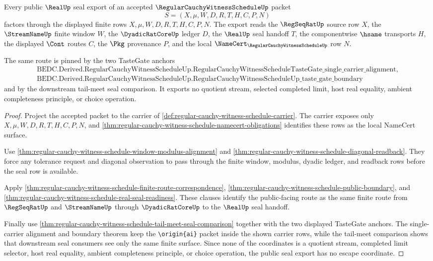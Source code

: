 \begin{theorem}
\label{thm:regular-cauchy-witness-schedule-seal-public-export}
Every public $\RealUp$ seal export of an accepted $\RegularCauchyWitnessScheduleUp$ packet
$$
S=(X,\mu,W,D,R,T,H,C,P,N)
$$
factors through the displayed finite rows $X,\mu,W,D,R,T,H,C,P,N$. The export reads the $\RegSeqRatUp$ source row $X$, the $\StreamNameUp$ finite window $W$, the $\DyadicRatCoreUp$ ledger $D$, the $\RealUp$ seal handoff $T$, the componentwise $\hsame$ transports $H$, the displayed $\Cont$ routes $C$, the $\Pkg$ provenance $P$, and the local $\NameCert_{\RegularCauchyWitnessScheduleUp}$ row $N$.

The same route is pinned by the two TasteGate anchors
$$
\begin{gathered}
\text{BEDC.Derived.RegularCauchyWitnessScheduleUp.RegularCauchyWitnessScheduleTasteGate\_single\_carrier\_alignment},\\
\text{BEDC.Derived.RegularCauchyWitnessScheduleUp.RegularCauchyWitnessScheduleUp\_taste\_gate\_boundary}
\end{gathered}
$$
and by the downstream tail-meet seal comparison. It exports no quotient stream, selected completed limit, host real equality, ambient completeness principle, or choice operation.
\end{theorem}
\begin{proof}
Project the accepted packet to the carrier of \autoref{def:regular-cauchy-witness-schedule-carrier}. The carrier exposes only $X,\mu,W,D,R,T,H,C,P,N$, and \autoref{thm:regular-cauchy-witness-schedule-namecert-obligations} identifies these rows as the local NameCert surface.

Use \autoref{thm:regular-cauchy-witness-schedule-window-modulus-alignment} and \autoref{thm:regular-cauchy-witness-schedule-diagonal-readback}. They force any tolerance request and diagonal observation to pass through the finite window, modulus, dyadic ledger, and readback rows before the seal row is available.

Apply \autoref{thm:regular-cauchy-witness-schedule-finite-route-correspondence}, \autoref{thm:regular-cauchy-witness-schedule-public-boundary}, and \autoref{thm:regular-cauchy-witness-schedule-real-seal-readiness}. These clauses identify the public-facing route as the same finite route from $\RegSeqRatUp$ and $\StreamNameUp$ through $\DyadicRatCoreUp$ to the $\RealUp$ seal handoff.

Finally use \autoref{thm:regular-cauchy-witness-schedule-tail-meet-seal-comparison} together with the two displayed TasteGate anchors. The single-carrier alignment and boundary theorem keep the \texttt{\textbackslash origin\{ai\}} packet inside the shown carrier rows, while the tail-meet comparison shows that downstream seal consumers see only the same finite surface. Since none of the coordinates is a quotient stream, completed limit selector, host real equality, ambient completeness principle, or choice operation, the public seal export has no escape coordinate.
\end{proof}

